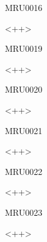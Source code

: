 \documentclass{article}
\begin{document}
\begin{corrige}{MRU0016}

<++>

\end{corrige}%






\begin{corrige}{MRU0019}

<++>

\end{corrige}%


\begin{corrige}{MRU0020}

<++>

\end{corrige}%


\begin{corrige}{MRU0021}

<++>

\end{corrige}%


\begin{corrige}{MRU0022}

<++>

\end{corrige}%


\begin{corrige}{MRU0023}

<++>

\end{corrige}%
\end{document}
